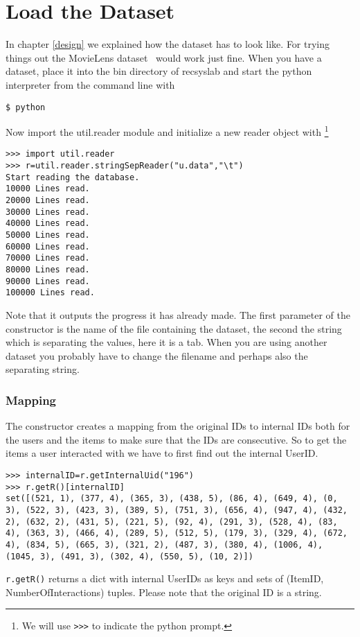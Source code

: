 \section{Load the Dataset}
In chapter \ref{design} we explained how the dataset has to look like.
For trying things out the MovieLens dataset~\cite{movielensdatasets} would work just fine.
When you have a dataset, place it into the bin directory of recsyslab and start the
python interpreter from the command line with
\begin{lstlisting}
$ python
\end{lstlisting}
Now import the util.reader module and initialize a new reader object with
\footnote{We will use \lstinline!>>>! to indicate the python prompt.}
\begin{lstlisting}[style=python]
>>> import util.reader
>>> r=util.reader.stringSepReader("u.data","\t")
Start reading the database.
10000 Lines read.
20000 Lines read.
30000 Lines read.
40000 Lines read.
50000 Lines read.
60000 Lines read.
70000 Lines read.
80000 Lines read.
90000 Lines read.
100000 Lines read.
\end{lstlisting}
Note that it outputs the progress it has already made.
The first parameter of the constructor is the name of the file containing the dataset,
the second the string which is separating the values, here it is a tab. 
When you are using another dataset you probably have to change the filename and perhaps
also the separating string.

\subsubsection*{Mapping}
The constructor creates a mapping from the original IDs to internal IDs both for the users
and the items to make sure that the IDs are consecutive. So to get the items a user interacted
with we have to first find out the internal UserID.
\begin{lstlisting}[style=python]
>>> internalID=r.getInternalUid("196")
>>> r.getR()[internalID]
set([(521, 1), (377, 4), (365, 3), (438, 5), (86, 4), (649, 4), (0, 3), (522, 3), (423, 3), (389, 5), (751, 3), (656, 4), (947, 4), (432, 2), (632, 2), (431, 5), (221, 5), (92, 4), (291, 3), (528, 4), (83, 4), (363, 3), (466, 4), (289, 5), (512, 5), (179, 3), (329, 4), (672, 4), (834, 5), (665, 3), (321, 2), (487, 3), (380, 4), (1006, 4), (1045, 3), (491, 3), (302, 4), (550, 5), (10, 2)])
\end{lstlisting}
\lstinline!r.getR()! returns a dict with internal UserIDs as keys and sets of (ItemID, NumberOfInteractions) tuples.
Please note that the original ID is a string.


